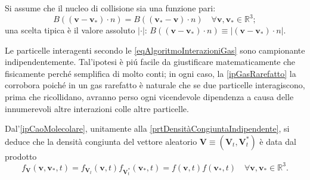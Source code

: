                 \begin{ipo}
                    \label{ipParitàTassoInterazioneGas}
                    Si assume che il nucleo di collisione sia una funzione pari:
                    \begin{equation}
                        \label{eqParitàNucleoCollisioneGas}
                        B((\mathbf v-\mathbf v_*)\cdot n)=B((\mathbf v_*-\mathbf v)\cdot n)
                        \quad\forall\mathbf v,\mathbf v_*\in\mathbb R^3;
                    \end{equation}
                    una scelta tipica è il valore assoluto \(\vert\cdot\vert\): \(B((\mathbf v-\mathbf v_*)\cdot n)\equiv\vert(\mathbf v-\mathbf v_*)\cdot n\vert\).
                \end{ipo}

                \begin{ipo}
                    \label{ipCaoMolecolare}
                    Le particelle interagenti secondo le \ref{eqAlgoritmoInterazioniGas} sono campionante indipendentemente. Tal'ipotesi è piú facile da giustificare matematicamente che fisicamente perché semplifica di molto conti; in ogni caso, la \ref{ipGasRarefatto} la corrobora poiché in un gas rarefatto è naturale che se due particelle interagiscono, prima che ricollidano, avranno perso ogni vicendevole dipendenza a causa delle innumerevoli altre interazioni colle altre particelle.
                \end{ipo}

                \begin{oss}
                    Dal'\cref{ipCaoMolecolare}, unitamente alla \cref{prtDensitàCongiuntaIndipendente}, si deduce che la densità congiunta del vettore aleatorio \(\mathbf V\equiv(\mathbf V_t,\mathbf V^*_t)\) è data dal prodotto
                    \[
                        f_{\mathbf V}(\mathbf v,\mathbf v_*,t)
                        =f_{\mathbf V_t}(\mathbf v,t)f_{\mathbf V^*_t}(\mathbf v_*,t)
                        =f(\mathbf v,t)f(\mathbf v_*,t)
                        \quad\forall \mathbf v,\mathbf v_*\in\mathbb R^3.
                    \]
                \end{oss}

